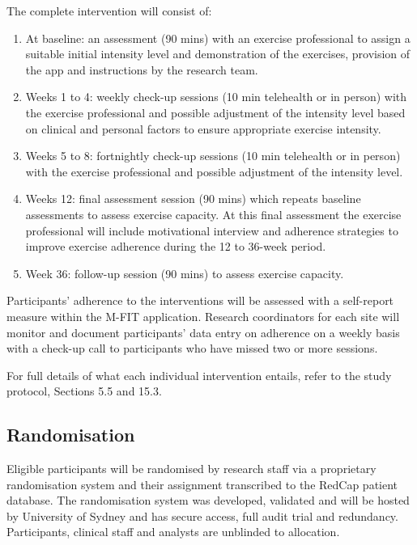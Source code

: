\documentclass[
]{article}
\begin{document}
The complete intervention will consist of:

\begin{enumerate}
  \def\labelenumi{\arabic{enumi}.}
  \item At baseline: an assessment (90 mins) with an exercise professional to assign a suitable initial intensity level and demonstration of the exercises, provision of the app and instructions by the research team.
  \item Weeks 1 to 4: weekly check-up sessions (10 min telehealth or in person) with the exercise professional and possible adjustment of the intensity level based on clinical and personal factors to ensure appropriate exercise intensity.
  \item Weeks 5 to 8: fortnightly check-up sessions (10 min telehealth or in person) with the exercise professional and possible adjustment of the intensity level.
  \item Weeks 12: final assessment session (90 mins) which repeats baseline assessments to assess exercise capacity. At this final assessment the exercise professional will include motivational interview and adherence strategies to improve exercise adherence during the 12 to 36-week period.
  \item Week 36: follow-up session (90 mins) to assess exercise capacity.
\end{enumerate}

Participants’ adherence to the interventions will be assessed with a self-report measure within the M-FIT application.
Research coordinators for each site will monitor and document participants’ data entry on adherence on a weekly basis with a check-up call to participants who have missed two or more sessions.

For full details of what each individual intervention entails, refer to the study protocol, Sections 5.5 and 15.3.

\hypertarget{randomisation}{%
  \subsection{Randomisation}\label{randomisation}}

Eligible participants will be randomised by research staff via a proprietary randomisation system and their assignment transcribed to the RedCap patient database.
The randomisation system was developed, validated and will be hosted by University of Sydney and has secure access, full audit trial and redundancy.
Participants, clinical staff and analysts are unblinded to allocation.
\end{document}
